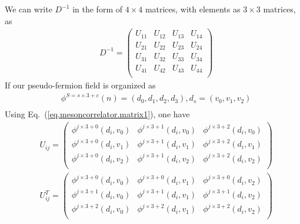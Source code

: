 We can write $D^{-1}$ in the form of $4\times 4$ matrices, with elements as $3\times 3$ matrices, as
\begin{equation}
\begin{split}
&D^{-1}=\left(\begin{array}{cccc} 
U_{11} & U_{12} & U_{13} & U_{14} \\
U_{21} & U_{22} & U_{23} & U_{24} \\
U_{31} & U_{32} & U_{33} & U_{34} \\
U_{41} & U_{42} & U_{43} & U_{44} \\
\end{array}\right)
\end{split}
\end{equation}
If our pseudo-fermion field is organized as
\begin{equation}
\begin{split}
&\phi ^{S=s\times 3+c}(n)=\left(d_0,d_1,d_2,d_3\right), d_s=\left(v_0,v_1,v_2\right)\\
\end{split}
\end{equation}
Using Eq.~(\ref{eq.mesoncorrelator.matrix1}), one have
\begin{equation}
\begin{split}
&U_{ij}=\left(\begin{array}{ccc}
\phi ^{j\times 3 + 0} (d_i,v_0) & \phi ^{j\times 3 + 1}(d_i,v_0) & \phi ^{j\times 3 + 2}(d_i,v_0)  \\
\phi ^{j\times 3 + 0} (d_i,v_1) & \phi ^{j\times 3 + 1}(d_i,v_1) & \phi ^{j\times 3 + 2}(d_i,v_1)  \\
\phi ^{j\times 3 + 0} (d_i,v_2) & \phi ^{j\times 3 + 1}(d_i,v_2) & \phi ^{j\times 3 + 2}(d_i,v_2)  \\
\end{array}\right)\\
&U_{ij}^T=\left(\begin{array}{ccc}
\phi ^{j\times 3 + 0} (d_i,v_0) & \phi ^{j\times 3 + 0}(d_i,v_1) & \phi ^{j\times 3 + 0}(d_i,v_2)  \\
\phi ^{j\times 3 + 1} (d_i,v_0) & \phi ^{j\times 3 + 1}(d_i,v_1) & \phi ^{j\times 3 + 1}(d_i,v_2)  \\
\phi ^{j\times 3 + 2} (d_i,v_0) & \phi ^{j\times 3 + 2}(d_i,v_1) & \phi ^{j\times 3 + 2}(d_i,v_2)  \\
\end{array}\right)\\
\end{split}
\end{equation}
